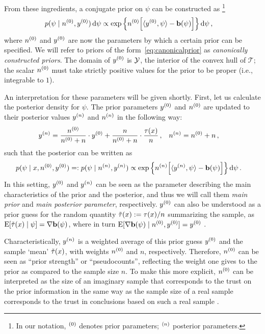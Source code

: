 From these ingredients, a conjugate prior on $\psi$ can be constructed as%
\footnote{In our notation, ${}^{(0)}$ denotes prior parameters; ${}^{(n)}$ posterior parameters.}
\begin{align}
\label{eq:canonicalprior}
p(\psi \mid n^{(0)}, y^{(0)}) \,\mathrm{d}\psi
 &\propto \exp\Big\{ n^{(0)} \Big[ \langle y^{(0)}, \psi \rangle - \mathbf{b}(\psi) \Big] \Big\} \,\mathrm{d}\psi\,,
\end{align}
where $n^{(0)}$ and $y^{(0)}$ are now the parameters by which a certain prior can be specified.
We will refer to priors of the form~\eqref{eq:canonicalprior} as \emph{canonically constructed priors}.
The domain of $y^{(0)}$ is $\mathcal{Y}$, the interior of the convex hull of $\mathcal{T}$;
the scalar $n^{(0)}$ must take strictly positive values for the prior to be proper (i.e., integrable to $1$).

An interpretation for these parameters will be given shortly.
First, let us calculate the posterior density for $\psi$.
The prior parameters $y^{(0)}$ and $n^{(0)}$ are updated to their posterior values $y^{(n)}$ and $n^{(n)}$ in the following way:
\begin{align}\label{eq:canonicalupdate}
y^{(n)} &= \frac{n^{(0)}}{n^{(0)} + n} \cdot y^{(0)} + \frac{n}{n^{(0)} + n} \cdot \frac{\tau(x)}{n}\,, &
n^{(n)} &= n^{(0)} + n\,,
\end{align}
such that the posterior can be written as
\begin{align}\label{eq:canonicalposterior}
p(\psi \mid x, n^{(0)}, y^{(0)})
 =: p(\psi \mid n^{(n)}, y^{(n)})
 &\propto \exp\Big\{ n^{(n)} \Big[ \langle y^{(n)}, \psi \rangle - \mathbf{b}(\psi) \Big] \Big\} \,\mathrm{d}\psi\,.
\end{align}
In this setting, $y^{(0)}$ and $y^{(n)}$ can be seen as the parameter describing the main characteristics of the prior and the posterior,
and thus we will call them \emph{main prior} and \emph{main posterior parameter}, respectively.
$y^{(0)}$ can also be understood as a prior guess for the random quantity $\tilde{\tau}(x) := \tau(x)/n$ summarizing the sample,
as $\operatorname{E}[\tilde{\tau}(x) \mid \psi] = \nabla\mathbf{b}(\psi)$,
where in turn $\operatorname{E}[\nabla\mathbf{b}(\psi) \mid n^{(0)}, y^{(0)}] = y^{(0)}$ \cite[e.g.,][Prop.~5.7, p.~275]{2000:bernardosmith}.

Characteristically, $y^{(n)}$ is a weighted average of this prior guess $y^{(0)}$ and the sample `mean' $\tilde{\tau}(x)$,
with weights $n^{(0)}$ and $n$, respectively.
Therefore, $n^{(0)}$ can be seen as ``prior strength'' or ``pseudocounts'',
reflecting the weight one gives to the prior as compared to the sample size $n$.
To make this more explicit, $n^{(0)}$ can be interpreted as the size of an imaginary sample
that corresponds to the trust on the prior information in the same way
as the sample size of a real sample
corresponds to the trust in conclusions based on such a real sample
\cite[p.~258]{Walter2009a-long}.


